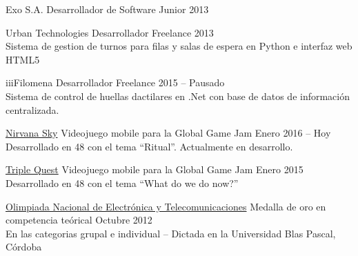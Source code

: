 \documentclass[10pt,a4paper]{article}
\begin{document}
\headedsection
    {Exo S.A.}
    {\textsc{}}{
    \headedsubsection
        {Desarrollador de Software Junior}
        {2013}
        {}
}

\headedsection
    {Urban Technologies}
    {\textsc{}}{
    \headedsubsection
        {Desarrollador Freelance}
        {2013}
        {\\Sistema de gestion de turnos para filas y salas de espera en Python e interfaz web HTML5}
}

\headedsection
    {iiiFilomena}
    {\textsc{}}{
    \headedsubsection
        {Desarrollador Freelance}
        {2015 -- Pausado}
        {\\Sistema de control de huellas dactilares en .Net con base de datos de información centralizada.}
}

\pagebreak

\spacedhrule{0.5em}{-0.4em}


\headedsection
    {\href{http://globalgamejam.org/2016/games/nirvana-sky}{Nirvana Sky}}
    {\textsc{}}{
    \headedsubsection
        {Videojuego mobile para la Global Game Jam}
        {Enero 2016 -- Hoy}
        {\\Desarrollado en 48 con el tema ``Ritual''. Actualmente en desarrollo.}
}

\headedsection
    {\href{http://globalgamejam.org/2015/games/triple-quest}{Triple Quest}}
    {\textsc{}}{
    \headedsubsection
        {Videojuego mobile para la Global Game Jam}
        {Enero 2015}
        {\\Desarrollado en 48 con el tema ``What do we do now?''}
}

\headedsection
    {\href{}{Olimpiada Nacional de Electrónica y Telecomunicaciones}}
    {\textsc{}}{
    \headedsubsection
        {Medalla de oro en competencia teórical}
        {Octubre 2012}
        {\\En las categorias grupal e individual -- Dictada en la Universidad Blas Pascal, Córdoba}
}
\end{document}
